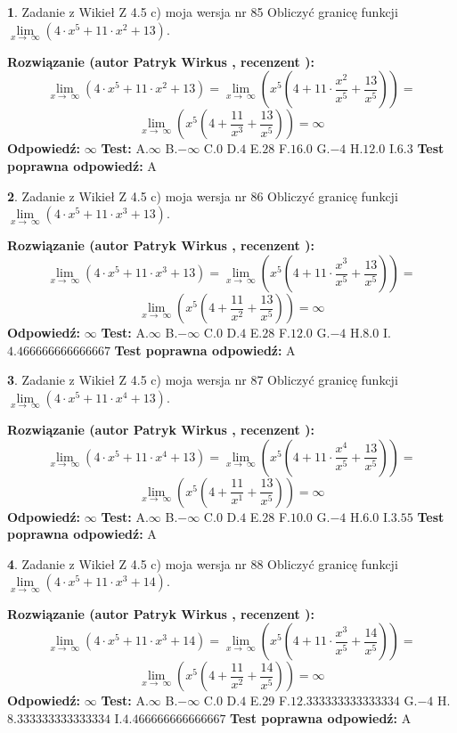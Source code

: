 \documentclass[12pt, a4paper]{article}
\theoremstyle{definition} %
\newtheorem{zad}{}
\newcommand{\zadStart}[1]{\begin{zad}#1\newline}
\newcommand{\zadStop}{\end{zad}}
\newcommand{\rozwStart}[2]{\noindent \textbf{Rozwiązanie (autor #1 , recenzent #2): }\newline}
\newcommand{\rozwStop}{\newline}
\newcommand{\odpStart}{\noindent \textbf{Odpowiedź:}\newline}
\newcommand{\odpStop}{\newline}
\newcommand{\testStart}{\noindent \textbf{Test:}\newline}
\newcommand{\testStop}{\newline}
\newcommand{\kluczStart}{\noindent \textbf{Test poprawna odpowiedź:}\newline}
\newcommand{\kluczStop}{\newline}
\begin{document}
\zadStart{Zadanie z Wikieł Z 4.5 c) moja wersja nr 85}
Obliczyć granicę funkcji  $\lim\limits_{x\to\ \infty}(4 \cdot x^{5}+11 \cdot x^{2}+13)$.
\zadStop
\rozwStart{Patryk Wirkus}{}
$$\lim\limits_{x\to\ \infty}(4 \cdot x^{5}+11 \cdot x^{2}+13) = \lim\limits_{x\to\ \infty}(x^{5}(4 +11 \cdot \frac{x^{2}}{x^{5}}+\frac{13}{x^{5}})) =$$ $$\lim\limits_{x\to\ \infty}(x^{5}(4 +\frac{11}{x^{3}}+\frac{13}{x^{5}})) =\infty$$
\rozwStop
\odpStart
$\infty$
\odpStop
\testStart
A.$\infty$ B.$-\infty$ C.$0$ D.$4$ E.$28$
F.$16.0$ G.$-4$
H.$12.0$
I.$6.3$
\testStop
\kluczStart
A
\kluczStop



\zadStart{Zadanie z Wikieł Z 4.5 c) moja wersja nr 86}
Obliczyć granicę funkcji  $\lim\limits_{x\to\ \infty}(4 \cdot x^{5}+11 \cdot x^{3}+13)$.
\zadStop
\rozwStart{Patryk Wirkus}{}
$$\lim\limits_{x\to\ \infty}(4 \cdot x^{5}+11 \cdot x^{3}+13) = \lim\limits_{x\to\ \infty}(x^{5}(4 +11 \cdot \frac{x^{3}}{x^{5}}+\frac{13}{x^{5}})) =$$ $$\lim\limits_{x\to\ \infty}(x^{5}(4 +\frac{11}{x^{2}}+\frac{13}{x^{5}})) =\infty$$
\rozwStop
\odpStart
$\infty$
\odpStop
\testStart
A.$\infty$ B.$-\infty$ C.$0$ D.$4$ E.$28$
F.$12.0$ G.$-4$
H.$8.0$
I.$4.466666666666667$
\testStop
\kluczStart
A
\kluczStop



\zadStart{Zadanie z Wikieł Z 4.5 c) moja wersja nr 87}
Obliczyć granicę funkcji  $\lim\limits_{x\to\ \infty}(4 \cdot x^{5}+11 \cdot x^{4}+13)$.
\zadStop
\rozwStart{Patryk Wirkus}{}
$$\lim\limits_{x\to\ \infty}(4 \cdot x^{5}+11 \cdot x^{4}+13) = \lim\limits_{x\to\ \infty}(x^{5}(4 +11 \cdot \frac{x^{4}}{x^{5}}+\frac{13}{x^{5}})) =$$ $$\lim\limits_{x\to\ \infty}(x^{5}(4 +\frac{11}{x^{1}}+\frac{13}{x^{5}})) =\infty$$
\rozwStop
\odpStart
$\infty$
\odpStop
\testStart
A.$\infty$ B.$-\infty$ C.$0$ D.$4$ E.$28$
F.$10.0$ G.$-4$
H.$6.0$
I.$3.55$
\testStop
\kluczStart
A
\kluczStop



\zadStart{Zadanie z Wikieł Z 4.5 c) moja wersja nr 88}
Obliczyć granicę funkcji  $\lim\limits_{x\to\ \infty}(4 \cdot x^{5}+11 \cdot x^{3}+14)$.
\zadStop
\rozwStart{Patryk Wirkus}{}
$$\lim\limits_{x\to\ \infty}(4 \cdot x^{5}+11 \cdot x^{3}+14) = \lim\limits_{x\to\ \infty}(x^{5}(4 +11 \cdot \frac{x^{3}}{x^{5}}+\frac{14}{x^{5}})) =$$ $$\lim\limits_{x\to\ \infty}(x^{5}(4 +\frac{11}{x^{2}}+\frac{14}{x^{5}})) =\infty$$
\rozwStop
\odpStart
$\infty$
\odpStop
\testStart
A.$\infty$ B.$-\infty$ C.$0$ D.$4$ E.$29$
F.$12.333333333333334$ G.$-4$
H.$8.333333333333334$
I.$4.466666666666667$
\testStop
\kluczStart
A
\kluczStop
\end{document}
